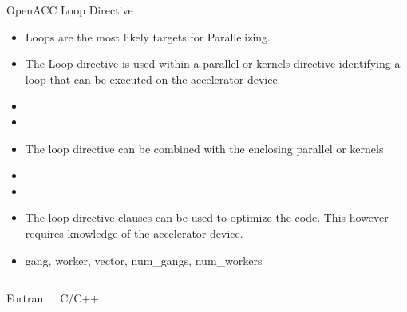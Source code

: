 \documentclass[10pt,t]{beamer}
\begin{document}
\begin{frame}[fragile,c]{OpenACC Loop Directive}
  \begin{itemize}
  \item Loops are the most likely targets for Parallelizing.
  \item The Loop directive is used within a parallel or kernels directive identifying a loop that can be executed on the accelerator device.
  \item[C:] 
  \item[Fortran:] 
  \item The loop directive can be combined with the enclosing parallel or kernels
  \item[C:] 
  \item[Fortran:] 
  \item The loop directive clauses can be used to optimize the code. This however requires knowledge of the accelerator device.
  \item[Clauses:] gang, worker, vector, num\_gangs, num\_workers
  \end{itemize}
  \vspace{-0.5cm}
  \begin{columns}
    \begin{exampleblock}{Fortran}
      
    \end{exampleblock}
    \begin{exampleblock}{C/C++}
      
    \end{exampleblock}
  \end{columns}
\end{frame}
\end{document}
